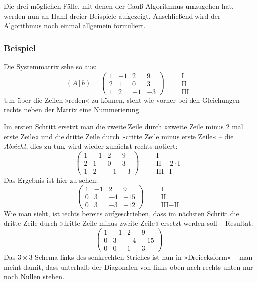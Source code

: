 Die drei möglichen Fälle, mit denen der Gauß-Algorithmus umzugehen hat, werden nun an Hand dreier Beispiele aufgezeigt. Anschließend wird der Algorithmus noch einmal allgemein formuliert.

\subsubsection{Beispiel}

Die Systemmatrix sehe so aus:
\[ (A\,|\,b) = \left(\begin{array}{ccc|c} 1 & -1 & 2 & 9\\ 2 & 1 & 0 & 3\\ 1 & 2 & -1 & -3 \end{array}\right) \qquad \begin{array}{l} \text{I}\\ \text{II}\\ \text{III} \end{array} \]
Um über die Zeilen »reden« zu können, steht wie vorher bei den Gleichungen rechts neben der Matrix eine Nummerierung.

Im ersten Schritt ersetzt man die zweite Zeile durch »zweite Zeile minus 2 mal erste Zeile« und die dritte Zeile durch »dritte Zeile minus erste Zeile« -- die \emph{Absicht}, dies zu tun, wird wieder zunächst rechts notiert:
\[ \left(\begin{array}{ccc|c} 1 & -1 & 2 & 9\\ 2 & 1 & 0 & 3\\ 1 & 2 & -1 & -3 \end{array}\right) \qquad \begin{array}{l} \text{I}\\ \text{II}-2\cdot\text{I}\\ \text{III}-\text{I} \end{array} \]
Das Ergebnis ist hier zu sehen:
\[ \left(\begin{array}{ccc|c} 1 & -1 & 2 & 9\\ 0 & 3 & -4 & -15\\ 0 & 3 & -3 & -12 \end{array}\right) \qquad \begin{array}{l} \text{I}\\ \text{II}\\ \text{III}-\text{II} \end{array} \]
Wie man sieht, ist rechts bereits aufgeschrieben, dass im nächsten Schritt die dritte Zeile durch »dritte Zeile minus zweite Zeile« ersetzt werden soll -- Resultat:
\[ \left(\begin{array}{ccc|c} 1 & -1 & 2 & 9\\ 0 & 3 & -4 & -15\\ 0 & 0 & 1 & 3 \end{array}\right) \]
Das $3 \times 3$-Schema links des senkrechten Striches ist nun in »Dreiecksform« -- man meint damit, dass unterhalb der Diagonalen von links oben nach rechts unten nur noch Nullen stehen.

